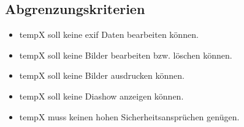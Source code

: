 \subsection{Abgrenzungskriterien} 
\begin{itemize}
	\item \gls{tempX} soll keine \gls{exif} Daten bearbeiten können.
	\item \gls{tempX} soll keine Bilder bearbeiten bzw. löschen können.
	\item \gls{tempX} soll keine Bilder ausdrucken können.
	\item \gls{tempX} soll keine Diashow anzeigen können.
	\item \gls{tempX} muss keinen hohen Sicherheitsansprüchen genügen.
\end{itemize}